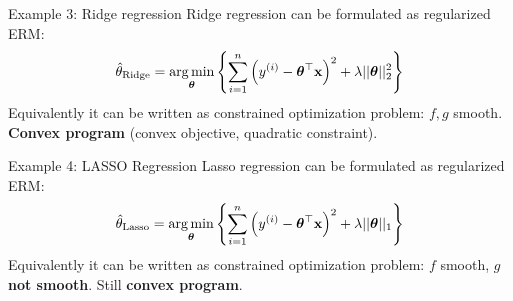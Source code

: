 \documentclass[11pt,compress,t,notes=noshow, xcolor=table]{beamer}
\begin{document}


\begin{frame2}{Example 3: Ridge regression}
Ridge regression can be formulated as regularized ERM:
$$
\hat{\theta}_{\text{Ridge}} = \mathop{\mathrm{arg\,min}}_{\bm{\theta}} \left\{ \sum\limits_{i=1}^n \left(y^{(i)} - \bm{\theta}^\top\mathbf{x}\right)^2 + \lambda ||\bm{\theta}||_2^2 \right\}
$$
Equivalently it can be written as constrained optimization problem:
\spacer
$f, g$ smooth. \textbf{Convex program} (convex objective, quadratic constraint).
\end{frame2}


\begin{frame2}{Example 4: LASSO Regression}
Lasso regression can be formulated as regularized ERM:
$$
\hat{\theta}_{\text{Lasso}} =  \mathop{\mathrm{arg\,min}}_{\bm{\theta}} \left\{ \sum\limits_{i=1}^n \left(y^{(i)} - \bm{\theta}^\top\mathbf{x}\right)^2 + \lambda ||\bm{\theta}||_1 \right\}
$$
Equivalently it can be written as constrained optimization problem:
\spacer
$f$ smooth, $g$ \textbf{not smooth}. Still \textbf{convex program}.
\end{frame2}
\end{document}
